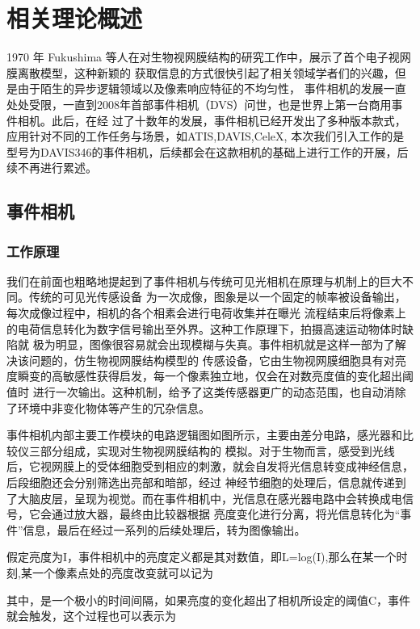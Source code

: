 \chapter{相关理论概述}
1970 年 Fukushima 等人\cite{fukushima1970electronic}在对生物视网膜结构的研究工作中，展示了首个电子视网膜离散模型，这种新颖的
获取信息的方式很快引起了相关领域学者们的兴趣，但是由于陌生的异步逻辑领域以及像素响应特征的不均匀性，
事件相机的发展一直处处受限，一直到2008年首部事件相机（DVS）问世，也是世界上第一台商用事件相机。此后，在经
过了十数年的发展，事件相机已经开发出了多种版本款式，应用针对不同的工作任务与场景，如ATIS,DAVIS,CeleX,
本次我们引入工作的是型号为DAVIS346的事件相机，后续都会在这款相机的基础上进行工作的开展，后续不再进行累述。

\section{事件相机}
\subsection{工作原理}
我们在前面也粗略地提起到了事件相机与传统可见光相机在原理与机制上的巨大不同。传统的可见光传感设备
为一次成像，图象是以一个固定的帧率被设备输出，每次成像过程中，相机的各个相素会进行电荷收集并在曝光
流程结束后将像素上的电荷信息转化为数字信号输出至外界。这种工作原理下，拍摄高速运动物体时缺陷就
极为明显，图像很容易就会出现模糊与失真。事件相机就是这样一部为了解决该问题的，仿生物视网膜结构模型的
传感设备\cite{tayarani2021event}，它由生物视网膜细胞具有对亮度瞬变的高敏感性获得启发，每一个像素独立地，仅会在对数亮度值的变化超出阈值时
进行一次输出。这种机制，给予了这类传感器更广的动态范围，也自动消除了环境中非变化物体等产生的冗杂信息。

事件相机内部主要工作模块的电路逻辑图如图所示，主要由差分电路，感光器和比较仪三部分组成，实现对生物视网膜结构的
模拟。对于生物而言，感受到光线后，它视网膜上的受体细胞受到相应的刺激，就会自发将光信息转变成神经信息，后段细胞还会分别筛选出亮部和暗部，经过
神经节细胞的处理后，信息就传递到了大脑皮层，呈现为视觉。而在事件相机中，光信息在感光器电路中会转换成电信号，它会通过放大器，最终由比较器根据
亮度变化进行分离，将光信息转化为“事件”信息，最后在经过一系列的后续处理后，转为图像输出。\cite{eibensteiner2017event}

假定亮度为I，事件相机中的亮度定义都是其对数值，即L=log(I),那么在某一个时刻,某一个像素点处的亮度改变就可以记为

其中，是一个极小的时间间隔，如果亮度的变化超出了相机所设定的阈值C，事件就会触发，这个过程也可以表示为

